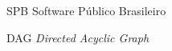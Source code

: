 \begin{siglas}
  \item[SPB] Software Público Brasileiro
  \item[DAG] \textit{Directed Acyclic Graph}
\end{siglas}
